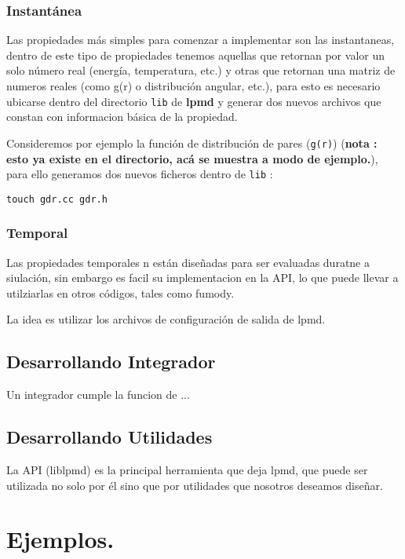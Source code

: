 \documentclass[a4paper,10pt]{scrbook}
\newcommand{\lpmd}{\textbf{lpmd }}
\begin{document}
\subsection{Instant\'anea}

Las propiedades m\'as simples para comenzar a implementar son las instantaneas, dentro de este tipo de propiedades tenemos aquellas que retornan por valor un solo n\'umero real (energ\'ia, temperatura, etc.) y otras que retornan una matriz de numeros reales (como g(r) o distribuci\'on angular, etc.), para esto es necesario ubicarse dentro del directorio \verb|lib| de \lpmd y generar dos nuevos archivos que constan con informacion b\'asica de la propiedad.

Consideremos por ejemplo la funci\'on de distribuci\'on de pares (\verb|g(r)|) (\textbf{nota : esto ya existe en el directorio, ac\'a se muestra a modo de ejemplo.}), para ello generamos dos nuevos ficheros dentro de \verb|lib| :

\begin{center}
 \verb|touch gdr.cc gdr.h|
\end{center}


\subsection{Temporal}

Las propiedades temporales n est\'an dise\~nadas para ser evaluadas duratne a siulaci\'on, sin embargo es facil su implementacion en la API, lo que puede llevar a utilziarlas en otros c\'odigos, tales como fumody.

La idea es utilizar los archivos de configuraci\'on de salida de lpmd.

\section{Desarrollando Integrador}

Un integrador cumple la funcion de ...

\section{Desarrollando Utilidades}

La API (liblpmd) es la principal herramienta que deja lpmd, que puede ser utilizada no solo por \'el sino que por utilidades que nosotros deseamos dise\~nar.

\chapter{Ejemplos.}
\label{chap:exa}
\end{document}
